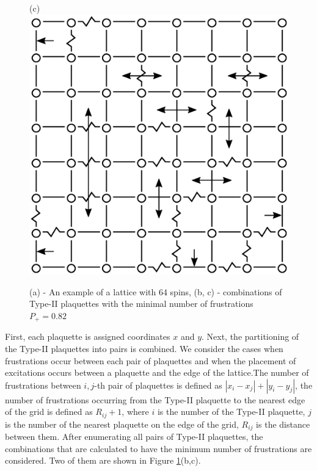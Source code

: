 \documentclass[preprint,12pt]{elsarticle}
\begin{document}
\begin{figure}[H]
\begin{minipage}[h]{0.3\linewidth}
	\end{minipage}
	\hspace{10pt}
	\begin{minipage}[h]{0.3\linewidth}
		\centering(c)
		\includegraphics[width=1\linewidth]{pictures/2PS_cell64_J72_5.eps}
	\end{minipage}
	\caption{(a) - An example of a lattice with 64 spins, (b, c) - combinations of Type-II plaquettes with the minimal number of frustrations $P_+ = 0.82$}
	\label{fig:12PS_cell64_J72_5}
\end{figure}


First, each plaquette is assigned coordinates $x$ and $y$. Next, the partitioning of the Type-II plaquettes into pairs is combined. We consider the cases when frustrations occur between each pair of plaquettes and when the placement of excitations occurs between a plaquette and the edge of the lattice.The number of frustrations between $i,j$-th pair of plaquettes is defined as $\left|x_i-x_j\right|+\left|y_i-y_j\right|$, the number of frustrations occurring from the Type-II plaquette to the nearest edge of the grid is defined as $R_{ij}+1$, where $i$ is the number of the Type-II plaquette, $j$ is the number of the nearest plaquette on the edge of the grid, $R_{ij}$ is the distance between them. After enumerating all pairs of Type-II plaquettes, the combinations that are calculated to have the minimum number of frustrations are considered. Two of them are shown in Figure \ref{fig:12PS_cell64_J72_5}(b,c).
\end{document}
